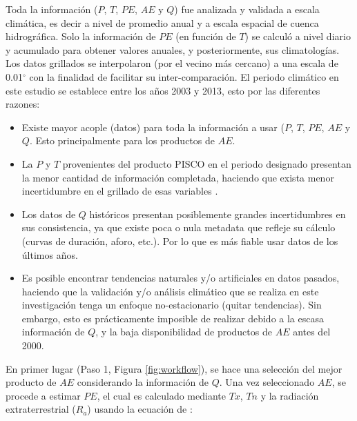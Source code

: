 \documentclass[12pt]{article}
\begin{document}


\thispagestyle{empty}

Toda la información ($P$, $T$, $PE$, $AE$ y $Q$) fue analizada y validada a escala climática, es decir a nivel de promedio anual y a escala espacial de cuenca hidrográfica. Solo la información de $PE$ (en función de $T$) se calculó a nivel diario y acumulado para obtener valores anuales, y posteriormente, sus climatologías. Los datos grillados se interpolaron (por el vecino más cercano) a una escala de 0.01$^{\circ}$ con la finalidad de facilitar su inter-comparación. El periodo climático en este estudio se establece entre los años 2003 y 2013, esto por las diferentes razones:

\begin{itemize}

	\item Existe mayor acople (datos) para toda la información a usar ($P$, $T$, $PE$, $AE$ y $Q$. Esto principalmente para los productos de $AE$.
	
	\item La $P$ y $T$ provenientes del producto PISCO en el periodo designado presentan la menor cantidad de información completada, haciendo que exista menor incertidumbre en el grillado de esas variables \citep{Huerta2019,Aybar2019}.
	
	\item Los datos de $Q$ históricos presentan posiblemente grandes incertidumbres en sus consistencia, ya que existe poca o nula metadata que refleje su cálculo (curvas de duración, aforo, etc.). Por lo que es más fiable usar datos de los últimos años.
	
	\item Es posible encontrar tendencias naturales y/o artificiales en datos pasados, haciendo que la validación y/o análisis climático que se realiza en este investigación tenga un enfoque no-estacionario (quitar tendencias). Sin embargo, esto es prácticamente imposible de realizar debido a la escasa información de $Q$, y la baja disponibilidad de productos de $AE$ antes del 2000.
	
\end{itemize}

En primer lugar (Paso 1, Figura \ref{fig:workflow}), se hace una selección del mejor producto de $AE$ considerando la información de $Q$. Una vez seleccionado $AE$, se procede a estimar $PE$, el cual es calculado mediante $Tx$, $Tn$ y la radiación extraterrestrial ($R_{a}$) usando la ecuación de \citet{Hargreaves1985}:
\end{document}
